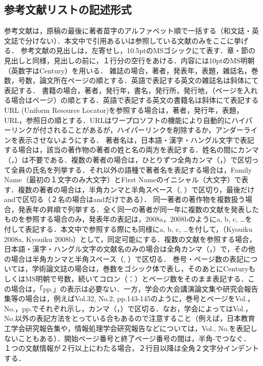 \documentclass[dvipdfmx]{jset-study-group}
\begin{document}
\subsection{参考文献リストの記述形式}

参考文献は，原稿の最後に著者苗字のアルファベット順で一括する（和文誌・英文誌で分けない）．本文中で引用あるいは参照している文献のみをここに挙げる．
参考文献の見出しは，左寄せし，10.5ptのMSゴシックにて表す．章・節の見出しと同様，見出しの前に，１行分の空行をあける．内容には10ptのMS明朝（英数字はCentury）を用いる．
雑誌の場合，著者，発表年，表題，雑誌名，巻数，号数，論文所在ページの順とする．英語で表記する英文の雑誌名は斜体にて表記する．
書籍の場合，著者，発行年，書名，発行所，発行地，（ページを入れる場合はページ）の順とする．英語で表記する英文の書籍名は斜体にて表記する
URL (Uniform Resource Locator)を参照する場合は，著者，発行年，表題，URL，参照日の順とする．URLはワープロソフトの機能により自動的にハイパーリンクが付されることがあるが，ハイパーリンクを削除するか，アンダーラインを表示させないようにする．
著者名は，日本語・漢字・ハングル文字で表記する場合は，該当の著作物の著者の姓と名の両方を表記する．姓名の間にカンマ（，）は不要である．複数の著者の場合は，ひとりずつ全角カンマ（，）で区切って全員の氏名を列挙する．それ以外の語種で著者名を表記する場合は，Family Name（最初の１文字のみ大文字）とFirst Nameのイニシャル（大文字）で表す．複数の著者の場合は，半角カンマと半角スペース（, ）で区切り，最後だけandで区切る（２名の場合はandだけである）．
同一著者の著作物を複数扱う場合，発表年の昇順で列挙する．全く同一の著者が同一年に複数の文献を発表したものを参照する場合のみ，発表年の表記は，2008a，2008bのようにa, b, c, …を付して表記する．本文中で参照する際にも同様にa, b, c, …を付して，（Kyouiku 2008a, Kyouiku 2008b）として，同定可能にする．複数の文献を参照する場合，日本語・漢字・ハングル文字の文献名のみの場合は全角カンマ（，）で，その他の場合は半角カンマと半角スペース（, ）で区切る．
巻号・ページ数の表記については，学術論文誌の場合は，巻数をゴシック体で表し，そのあとにCenturyもしくはMS明朝で号数，続いてコロン（：）とページ数をそのまま表記する．この場合は，「pp.」の表示は必要ない．一方，学会の大会講演論文集や研究会報告集等の場合は，例えばVol.32, No.2, pp.143-145のように，巻号とページをVol.，No.，pp.でそれぞれ示し，カンマ（，）で区切る．なお，学会によってはVol.，No.以外の表記方法をとっている合もあるので注意すること（例えば，日本教育工学会研究報告集や，情報処理学会研究報告などについては，Vol., No.を表記しないこともある）．開始ページ番号と終了ページ番号の間は，半角-でつなぐ．
１つの文献情報が２行以上にわたる場合，２行目以降は全角２文字分インデントする．
\end{document}
